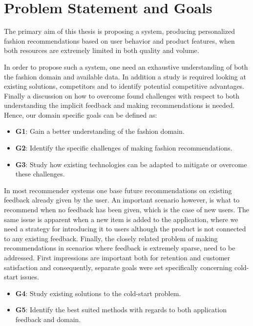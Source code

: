 \section{Problem Statement and Goals}
\label{sec:problem-statement}

The primary aim of this thesis is proposing a system, producing personalized
fashion recommendations based on user behavior and product features, when both
resources are extremely limited in both quality and volume.

In order to propose such a system, one need an exhaustive understanding of both
the fashion domain and available data. In addition a study is required looking
at existing solutions, competitors and to identify potential competitive
advantages. Finally a discussion on how to overcome found challenges with
respect to both understanding the implicit feedback and making recommendations
is needed. Hence, our domain specific goals can be defined as:

\begin{itemize}
	\item \textbf{G1}: Gain a better understanding of the fashion domain.
  \item \textbf{G2}: Identify the specific challenges of making fashion recommendations.
  \item \textbf{G3}: Study how existing technologies can be adapted to mitigate or
  overcome these challenges.
\end{itemize}

In most recommender systems one base future recommendations on existing
feedback already given by the user. An important scenario however, is what to
recommend when no feedback has been given, which is the case of new users. The
same issue is apparent when a new item is added to the application, where we
need a strategy for introducing it to users although the product is not
connected to any existing feedback. Finally, the closely related problem of
making recommendations in scenarios where feedback is extremely sparse, need to
be addressed. First impressions are important both for retention and customer
satisfaction and consequently, separate goals were set specifically concerning
cold-start issues.

\begin{itemize}
  \item \textbf{G4}: Study existing solutions to the cold-start problem.
  \item \textbf{G5}: Identify the best suited methods with regards to both application
  feedback and domain.
\end{itemize}

